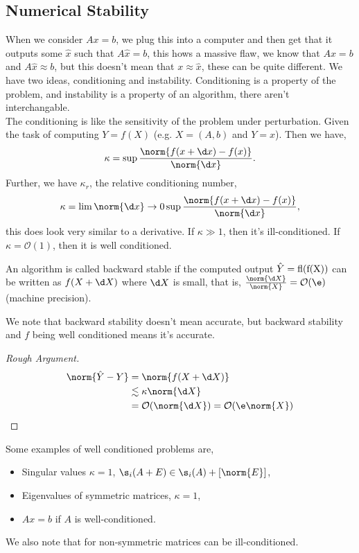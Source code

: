 
\subsection{Numerical Stability}
When we consider $Ax = b$, we plug this into a computer and then get that it outputs some $\hat x$ such that $A\hat x = b$, this hows a massive flaw, we know that $Ax = b$ and $A\hat x \approx b$, but this doesn't mean that $x \approx \hat x$, these can be quite different. We have two ideas, conditioning and instability. Conditioning is a property of the problem, and instability is a property of an algorithm, there aren't interchangable.\\

\noindent
The conditioning is like the sensitivity of the problem under perturbation. Given the task of computing $Y = f(X)$ (e.g. $X = (A, b)$ and $Y = x$). Then we have,
$$ \kappa = \sup \frac{\norm{f(x + \d x) - f(x)}}{\norm{\d x}}. $$
Further, we have $\kappa_r$, the relative conditioning number,
$$ \kappa = \lim{\norm{\d x} \to 0}\sup \frac{\norm{f(x + \d x) - f(x)}}{\norm{\d x}}, $$
this does look very similar to a derivative. If $\kappa \gg 1$, then it's ill-conditioned. If $\kappa = \mathcal{O}(1)$, then it is well conditioned.\\

\noindent
\begin{ndefi}
  An algorithm is called backward stable if the computed output $\hat Y = \rm{fl}(f(X))$ can be written as $f(X + \d X)$ where $\d X$ is small, that is, $\frac{\norm{\d X}}{\norm{X}} = \mathcal{O}(\e)$ (machine precision).
\end{ndefi}

\begin{note}
  We note that backward stability doesn't mean accurate, but backward stability and $f$ being well conditioned means it's accurate.
\end{note}
\begin{proof}[Rough Argument]
  \begin{align*}
    \norm{\hat Y - Y} &= \norm{f(X + \d X)} \\
    &\lesssim \kappa \norm{\d X} \\
    &= \mathcal{O}(\norm{\d X}) = \mathcal{O}(\e\norm{X})
  \end{align*}
\end{proof}

\noindent
Some examples of well conditioned problems are,
\begin{itemize}
  \item Singular values $\kappa = 1$, $\s_i(A + E) \in \s_i(A) + [\norm{E}]$,
  \item Eigenvalues of symmetric matrices, $\kappa = 1$,
  \item $Ax = b$ if $A$ is well-conditioned.
\end{itemize}
We also note that for non-symmetric matrices can be ill-conditioned.\\

